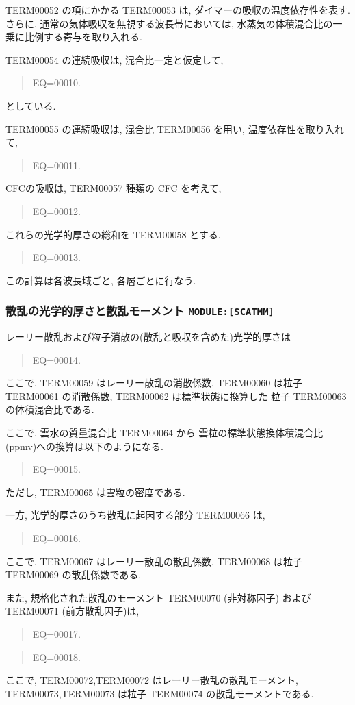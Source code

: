 TERM00052 の項にかかる TERM00053 は, 
ダイマーの吸収の温度依存性を表す.
さらに, 通常の気体吸収を無視する波長帯においては,
水蒸気の体積混合比の一乗に比例する寄与を取り入れる.

TERM00054 の連続吸収は, 混合比一定と仮定して,
\begin{quote}
EQ=00010.
\end{quote}
としている.

TERM00055 の連続吸収は, 混合比 TERM00056 を用い, 温度依存性を取り入れて,
\begin{quote}
EQ=00011.
\end{quote}

CFCの吸収は, TERM00057 種類の CFC を考えて,
\begin{quote}
EQ=00012.
\end{quote}

これらの光学的厚さの総和を TERM00058 とする.
\begin{quote}
EQ=00013.
\end{quote}

この計算は各波長域ごと, 各層ごとに行なう.

\subsubsection{散乱の光学的厚さと散乱モーメント \texttt{MODULE:[SCATMM]}}

レーリー散乱および粒子消散の(散乱と吸収を含めた)光学的厚さは
\begin{quote}
EQ=00014.
\end{quote}
ここで, TERM00059 はレーリー散乱の消散係数,
TERM00060 は粒子 TERM00061 の消散係数,
TERM00062 は標準状態に換算した
粒子 TERM00063 の体積混合比である.

ここで, 雲水の質量混合比 TERM00064 から
雲粒の標準状態換体積混合比(ppmv)への換算は以下のようになる.
\begin{quote}
EQ=00015.
\end{quote}
ただし, TERM00065 は雲粒の密度である.

一方, 光学的厚さのうち散乱に起因する部分 TERM00066 は,
\begin{quote}
EQ=00016.
\end{quote}
ここで, TERM00067 はレーリー散乱の散乱係数,
TERM00068 は粒子 TERM00069 の散乱係数である.

また, 規格化された散乱のモーメント 
TERM00070 (非対称因子) および TERM00071 (前方散乱因子)は,
\begin{quote}
EQ=00017.
\end{quote}
\begin{quote}
EQ=00018.
\end{quote}
ここで, TERM00072,TERM00072 はレーリー散乱の散乱モーメント,
TERM00073,TERM00073 は粒子 TERM00074 の散乱モーメントである.

